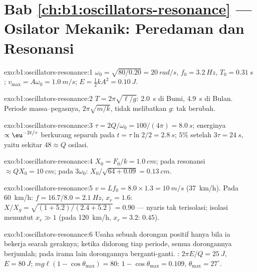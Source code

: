 \section*{Bab \ref{ch:b1:oscillators-resonance} --- Osilator Mekanik: Peredaman dan Resonansi}

\begin{solution}{exo:b1:oscillators-resonance:1}
$\omega_0 = \sqrt{80/0.20} = \qty{20}{rad/s}$, $f_0 = \qty{3.2}{Hz}$, $T_0 =
\qty{0.31}{s}$; $v_{\max} = A\omega_0 = \qty{1.0}{m/s}$; $E = \tfrac12 kA^2 =
\qty{0.10}{J}$.
\end{solution}

\begin{solution}{exo:b1:oscillators-resonance:2}
$T = 2\pi\sqrt{\ell/g}$: \qty{2.0}{s} di Bumi, \qty{4.9}{s} di Bulan.
Periode massa--pegasnya, $2\pi\sqrt{m/k}$, tidak melibatkan $g$: tak
berubah.
\end{solution}

\begin{solution}{exo:b1:oscillators-resonance:3}
$\tau = 2Q/\omega_0 = 100/(4\pi) = \qty{8.0}{s}$; energinya $\propto \eu^{-2t/\tau}$
berkurang separuh pada $t = \tau\ln2/2 = \qty{2.8}{s}$; $5\%$ setelah $3\tau = \qty{24}{s}$,
yaitu sekitar $48 \approx Q$ osilasi.
\end{solution}

\begin{solution}{exo:b1:oscillators-resonance:4}
$X_0 = F_0/k = \qty{1.0}{cm}$; pada resonansi $\approx QX_0 = \qty{10}{cm}$;
pada $3\omega_0$: $X_0/\sqrt{64 + 0.09} = \qty{0.13}{cm}$.
\end{solution}

\begin{solution}{exo:b1:oscillators-resonance:5}
$v = Lf_0 = 8.0 \times 1.3 = \qty{10}{m/s}$ (\qty{37}{km/h}). Pada
\qty{60}{km/h}: $f = 16.7/8.0 = \qty{2.1}{Hz}$, $x_r = 1.6$: $X/X_g =
\sqrt{(1 + 5.2)/(2.4 + 5.2)} = 0.90$ --- nyaris tak terisolasi; isolasi
menuntut $x_r \gg 1$ (pada \qty{120}{km/h}, $x_r = 3.2$: $0.45$).
\end{solution}

\begin{solution}{exo:b1:oscillators-resonance:6}
Usaha sebuah dorongan positif hanya bila ia bekerja searah geraknya;
ketika didorong tiap periode, semua dorongannya berjumlah; pada irama
lain dorongannya berganti-ganti. : $2\pi E/Q = \qty{25}{J}$, $E = \qty{80}{J}$;
$mg\ell(1 - \cos\theta_{\max}) = 80$: $1 - \cos\theta_{\max} = 0.109$,
$\theta_{\max} = 27^\circ$.
\end{solution}

